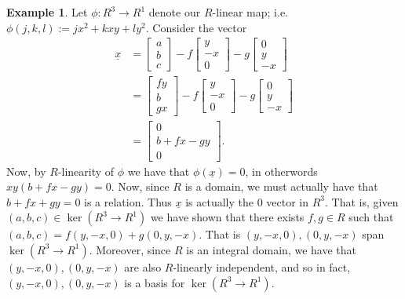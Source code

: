 \documentclass{article}
\theoremstyle{definition}
\newtheorem{example}[theorem]{Example}
\theoremstyle{remark}
\newcommand{\bmat}[1]{
    \begin{bmatrix*}
        #1
    \end{bmatrix*}
}
\begin{document}
\begin{example}
    Let $\phi: R^3 \to R^1$ denote our $R$-linear map; i.e. $\phi(j,k,l) := jx^2 +
    kxy + ly^2$. 
    Consider the vector 
    \begin{align*}
        \underline x &= \bmat{a \\ b \\ c} - f\bmat{y \\ -x \\ 0} - g\bmat{0 \\ y \\ -x} \\
        &= \bmat{fy \\ b \\ gx} - f\bmat{y \\ -x \\ 0} - g\bmat{0 \\ y \\ -x} \\
        &= \bmat{0 \\ b + fx - gy \\ 0}. 
    \end{align*}
    Now, by $R$-linearity of $\phi$ we have that $\phi(\underline x) = 0$, in
    otherwords $xy(b + fx - gy) = 0$. Now, since $R$ is a domain, we must
    actually have that $b + fx + gy = 0$ is a relation.
    Thus $\underline x$ is actually the $0$ vector in $R^3$. 
    That is, given $(a,b,c) \in \ker(R^3 \to R^1)$ we have shown that there
    exists $f,g \in R$ such that $(a,b,c) = f(y,-x,0) + g(0, y,-x)$.
    That is $(y,-x, 0), (0,y,-x)$ span $\ker(R^3 \to R^1)$. 
    Moreover, since $R$ is an integral domain, we have that $(y,-x,0), (0,y,-x)$
    are also $R$-linearly independent, and so in fact, $(y, -x, 0), (0,y,-x)$ is
    a basis for $\ker(R^3 \to R^1)$. 


\end{example}
\end{document}
